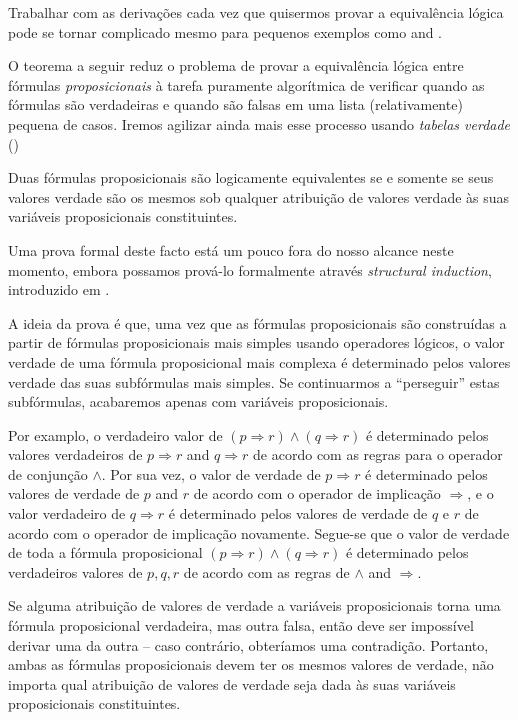 Trabalhar com as derivações cada vez que quisermos provar a equivalência lógica pode se tornar complicado mesmo para pequenos exemplos como and .


O teorema a seguir reduz o problema de provar a equivalência lógica entre fórmulas \textit{proposicionais} à tarefa puramente algorítmica de verificar quando as fórmulas são verdadeiras e quando são falsas em uma lista (relativamente) pequena de casos. Iremos agilizar ainda mais esse processo usando \textit{tabelas verdade} ()


\begin{theorem}
\label{thmLogicalEquivalentIffSameTruthValues}
Duas fórmulas proposicionais são logicamente equivalentes se e somente se seus valores verdade são os mesmos sob qualquer atribuição de valores verdade às suas variáveis ​​proposicionais constituintes.
\end{theorem}


\begin{cidea}
Uma prova formal deste facto está um pouco fora do nosso alcance neste momento, embora possamos prová-lo formalmente através  \textit{structural induction}, introduzido em .

A ideia da prova é que, uma vez que as fórmulas proposicionais são construídas a partir de fórmulas proposicionais mais simples usando operadores lógicos, o valor verdade de uma fórmula proposicional mais complexa é determinado pelos valores verdade das suas subfórmulas mais simples. Se continuarmos a “perseguir” estas subfórmulas, acabaremos apenas com variáveis ​​proposicionais.

Por examplo, o verdadeiro valor de $(p \Rightarrow r) \wedge (q \Rightarrow r)$ é determinado pelos valores verdadeiros de $p \Rightarrow r$ and $q \Rightarrow r$ de acordo com as regras para o operador de conjunção $\wedge$. Por sua vez, o valor de verdade de $p \Rightarrow r$ é determinado pelos valores de verdade de $p$ and $r$ de acordo com o operador de implicação $\Rightarrow$, e o valor verdadeiro de $q \Rightarrow r$ é determinado pelos valores de verdade de $q$ e $r$ de acordo com o operador de implicação novamente. Segue-se que o valor de verdade de toda a fórmula proposicional $(p \Rightarrow r) \wedge (q \Rightarrow r)$ é determinado pelos verdadeiros valores de $p,q,r$ de acordo com as regras de $\wedge$ and $\Rightarrow$.

Se alguma atribuição de valores de verdade a variáveis ​​proposicionais torna uma fórmula proposicional verdadeira, mas outra falsa, então deve ser impossível derivar uma da outra – caso contrário, obteríamos uma contradição. Portanto, ambas as fórmulas proposicionais devem ter os mesmos valores de verdade, não importa qual atribuição de valores de verdade seja dada às suas variáveis ​​proposicionais constituintes.
\end{cidea}

